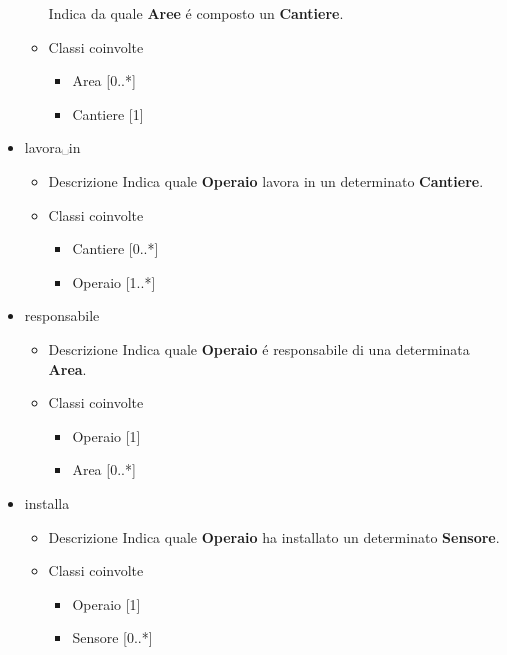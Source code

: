 \documentclass[11pt]{article}
\begin{document}
\begin{itemize}
\begin{itemize}
Indica da quale \textbf{Aree} é composto un \textbf{Cantiere}.
\item Classi coinvolte
\label{sec:orgbfb6476}
\begin{itemize}
\item Area [0..*]
\item Cantiere [1]
\end{itemize}
\end{itemize}
\item lavora␣in
\label{sec:org32c00e6}
\begin{itemize}
\item Descrizione
\label{sec:org458e8b8}
Indica quale \textbf{Operaio} lavora in un determinato \textbf{Cantiere}.
\item Classi coinvolte
\label{sec:org9b01c8b}
\begin{itemize}
\item Cantiere [0..*]
\item Operaio [1..*]
\end{itemize}
\end{itemize}
\item responsabile
\label{sec:org6da7de0}
\begin{itemize}
\item Descrizione
\label{sec:org3184d43}
Indica quale \textbf{Operaio} é responsabile di una determinata \textbf{Area}.
\item Classi coinvolte
\label{sec:org6451df2}
\begin{itemize}
\item Operaio [1]
\item Area [0..*]
\end{itemize}
\end{itemize}
\item installa
\label{sec:org2e3b28e}
\begin{itemize}
\item Descrizione
\label{sec:org807fedd}
Indica quale \textbf{Operaio} ha installato un determinato \textbf{Sensore}.
\item Classi coinvolte
\label{sec:org62a5115}
\begin{itemize}
\item Operaio [1]
\item Sensore [0..*]
\end{itemize}
\end{itemize}
\end{itemize}
\end{document}
